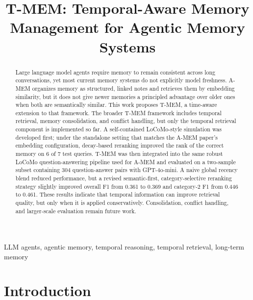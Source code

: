 \documentclass[conference]{IEEEtran}
\begin{document}
\title{T-MEM: Temporal-Aware Memory Management for Agentic Memory Systems}

\author{
}

\maketitle

\begin{abstract}
Large language model agents require memory to remain consistent across long conversations, yet most current memory systems do not explicitly model freshness. A-MEM organizes memory as structured, linked notes and retrieves them by embedding similarity, but it does not give newer memories a principled advantage over older ones when both are semantically similar. This work proposes T-MEM, a time-aware extension to that framework. The broader T-MEM framework includes temporal retrieval, memory consolidation, and conflict handling, but only the temporal retrieval component is implemented so far. A self-contained LoCoMo-style simulation was developed first; under the standalone setting that matches the A-MEM paper's embedding configuration, decay-based reranking improved the rank of the correct memory on 6 of 7 test queries. T-MEM was then integrated into the same robust LoCoMo question-answering pipeline used for A-MEM and evaluated on a two-sample subset containing 304 question-answer pairs with GPT-4o-mini. A naive global recency blend reduced performance, but a revised semantic-first, category-selective reranking strategy slightly improved overall F1 from 0.361 to 0.369 and category-2 F1 from 0.446 to 0.461. These results indicate that temporal information can improve retrieval quality, but only when it is applied conservatively. Consolidation, conflict handling, and larger-scale evaluation remain future work.
\end{abstract}

\begin{IEEEkeywords}
LLM agents, agentic memory, temporal reasoning, temporal retrieval, long-term memory
\end{IEEEkeywords}

\section{Introduction}
\end{document}
